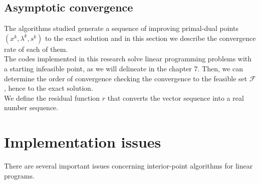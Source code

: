 \documentclass[a4paper,10 pt,titlepage,twoside]{book}
\theoremstyle{plain}
\theoremstyle{definition}
\theoremstyle{remark}
\begin{document}

\newpage
\section{Asymptotic convergence}
The algorithms studied generate a sequence of improving primal-dual points $(x^{k},\lambda^{k}, s^{k})$ to the exact solution and in this section we describe the convergence rate of each of them. \\
The codes implemented in this research solve linear programming problems with a starting infeasible point, as we will delineate in the chapter 7. Then, we can determine the order of convergence checking the convergence to the feasible set $\mathcal{F}$, hence to the exact solution.\\
We define the residual function $r$ that converts the vector sequence into a real number sequence.
\chapter{Implementation issues}
There are several important issues concerning interior-point algorithms
for linear programs.
\end{document}
